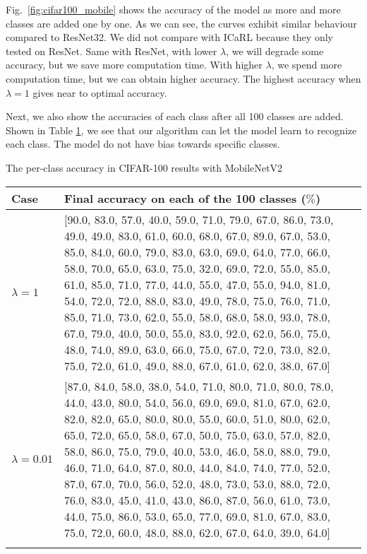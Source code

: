 Fig.~\ref{fig:cifar100_mobile} shows the accuracy of the model as more and more classes are added one by one. As we can see, the curves exhibit similar behaviour compared to ResNet32. We did not compare with ICaRL because they only tested on ResNet. Same with ResNet, with lower $\lambda$, we will degrade some accuracy, but we save more computation time. With higher $\lambda$, we spend more computation time, but we can obtain higher accuracy. The highest accuracy when $\lambda=1$ gives near to optimal accuracy.

Next, we also show the accuracies of each class after all 100 classes are added. Shown in Table \ref{tab:cifar100_mobile}, we see that our algorithm can let the model learn to recognize each class. The model do not have bias towards specific classes.
\begin{table}[!hpb]
	\centering
	{The per-class accuracy in CIFAR-100 results with MobileNetV2}
	\label{tab:firstone}
	\begin{tabular}{@{}lp{10cm}@{}} \toprule
		Case &  Final accuracy on each of the 100 classes ($\%$)\\ \midrule
		$\lambda=1$  &[90.0, 83.0, 57.0, 40.0, 59.0, 71.0, 79.0, 67.0, 86.0, 73.0, 49.0, 49.0, 83.0, 61.0, 60.0, 68.0, 67.0, 89.0, 67.0, 53.0, 85.0, 84.0, 60.0, 79.0, 83.0, 63.0, 69.0, 64.0, 77.0, 66.0, 58.0, 70.0, 65.0, 63.0, 75.0, 32.0, 69.0, 72.0, 55.0, 85.0, 61.0, 85.0, 71.0, 77.0, 44.0, 55.0, 47.0, 55.0, 94.0, 81.0, 54.0, 72.0, 72.0, 88.0, 83.0, 49.0, 78.0, 75.0, 76.0, 71.0, 85.0, 71.0, 73.0, 62.0, 55.0, 58.0, 68.0, 58.0, 93.0, 78.0, 67.0, 79.0, 40.0, 50.0, 55.0, 83.0, 92.0, 62.0, 56.0, 75.0, 48.0, 74.0, 89.0, 63.0, 66.0, 75.0, 67.0, 72.0, 73.0, 82.0, 75.0, 72.0, 61.0, 49.0, 88.0, 67.0, 61.0, 62.0, 38.0, 67.0]
		
		\\
		$\lambda=0.01$  & [87.0, 84.0, 58.0, 38.0, 54.0, 71.0, 80.0, 71.0, 80.0, 78.0, 44.0, 43.0, 80.0, 54.0, 56.0, 69.0, 69.0, 81.0, 67.0, 62.0, 82.0, 82.0, 65.0, 80.0, 80.0, 55.0, 60.0, 51.0, 80.0, 62.0, 65.0, 72.0, 65.0, 58.0, 67.0, 50.0, 75.0, 63.0, 57.0, 82.0, 58.0, 86.0, 75.0, 79.0, 40.0, 53.0, 46.0, 58.0, 88.0, 79.0, 46.0, 71.0, 64.0, 87.0, 80.0, 44.0, 84.0, 74.0, 77.0, 52.0, 87.0, 67.0, 70.0, 56.0, 52.0, 48.0, 73.0, 53.0, 88.0, 72.0, 76.0, 83.0, 45.0, 41.0, 43.0, 86.0, 87.0, 56.0, 61.0, 73.0, 44.0, 75.0, 86.0, 53.0, 65.0, 77.0, 69.0, 81.0, 67.0, 83.0, 75.0, 72.0, 60.0, 48.0, 88.0, 62.0, 67.0, 64.0, 39.0, 64.0]
		
		\\ \bottomrule
		\label{tab:cifar100_mobile}
	\end{tabular}
\end{table}

